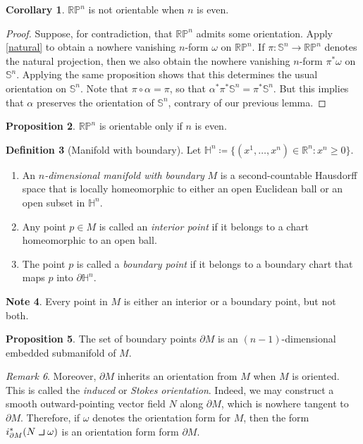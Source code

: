 \documentclass[10pt,letterpaper,cm]{nupset}
\theoremstyle{definition}
\newtheorem{definition}{Definition}[subsection]
\newtheorem{note}[definition]{Note}
\theoremstyle{theorem}
\newtheorem{prop}[definition]{Proposition}
\newtheorem{corollary}[definition]{Corollary}
\theoremstyle{remark}
\newtheorem{remark}[definition]{Remark}
\renewcommand{\H}{\mathbb H}
\newcommand{\R}{\mathbb R}
\newcommand{\RP}{\mathbb{RP}}
\renewcommand{\S}{\mathbb S}
\newcommand{\1}{\mathbf{1}}
\newcommand{\0}{\vec 0}
\newcommand{\intprodl}{%
    \mathbin{\scalebox{1.5}{$\lrcorner$}}%
}
\begin{document}
\begin{corollary}
$\RP^n$ is not orientable when $n$ is even. 
\end{corollary}
\begin{proof}
Suppose, for contradiction, that $\RP^n$ admits some orientation. Apply \cref{natural} to obtain a nowhere vanishing $n$-form $\omega$ on $\RP^n$. If $\pi : \S^n \to \RP^n$ denotes the natural projection, then we also obtain the nowhere vanishing $n$-form $\pi^{\ast}\omega$ on $\S^n$. Applying the same proposition shows that this determines the usual orientation on $\S^n$. Note that $\pi \circ \alpha = \pi$, so that $\alpha^{\ast} \pi^{\ast} \S^n = \pi^{\ast}\S^n$. But this implies that $\alpha$ preserves the orientation of $\S^n$, contrary of our previous lemma.
\end{proof}

\begin{prop}
$\RP^n$ is orientable only if $n$ is even. 
\end{prop}

\begin{definition}[Manifold with boundary]
Let $\H^n\coloneqq  \{(x^1, \ldots, x^n) \in \R^n : x^n \geq 0\}.$ 
\begin{enumerate}
\item An \textit{$n$-dimensional manifold with boundary} $M$ is a second-countable Hausdorff space that is locally homeomorphic to either an open Euclidean ball or an open subset in $\H^n$. 
\item Any point $p\in M$ is called an \textit{interior point} if it belongs to a chart homeomorphic to an open ball. 
\item The  point $p$ is called a \textit{boundary point} if it belongs to a boundary chart that maps $p$ into $\partial{\H^n}$.
\end{enumerate}
\end{definition}

\begin{note}
Every point in $M$ is either an interior or a boundary point, but not both.
\end{note}

\begin{prop}
The set of boundary points $\partial{M}$ is an $(n-1)$-dimensional embedded submanifold of $M$.
\end{prop}

\begin{remark}
Moreover, $\partial{M}$ inherits an orientation from $M$ when $M$ is oriented. This is called the \textit{induced} or \textit{Stokes orientation}. Indeed, we may construct a smooth  outward-pointing vector field $N$ along $\partial{M}$, which is nowhere tangent to $\partial{M}$. Therefore,  if $\omega$ denotes the orientation form for $M$, then the form $i^{\ast}_{\partial{M}}(N \intprodl \omega)$ is an orientation form form $\partial{M}$.
\end{remark}
\end{document}
